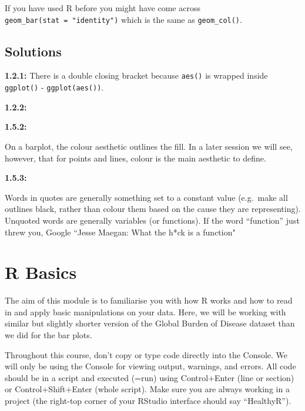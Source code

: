 \documentclass[]{book}
\makeatletter
\newenvironment{Shaded}{\begin{snugshade}}{\end{snugshade}}
\newcommand{\KeywordTok}[1]{\textcolor[rgb]{0.13,0.29,0.53}{\textbf{#1}}}
\newcommand{\DataTypeTok}[1]{\textcolor[rgb]{0.13,0.29,0.53}{#1}}
\newcommand{\StringTok}[1]{\textcolor[rgb]{0.31,0.60,0.02}{#1}}
\newcommand{\OperatorTok}[1]{\textcolor[rgb]{0.81,0.36,0.00}{\textbf{#1}}}
\newcommand{\NormalTok}[1]{#1}
\newenvironment{kframe}{%
\medskip{}
\setlength{\fboxsep}{.8em}
 \def\at@end@of@kframe{}%
 \ifinner\ifhmode%
  \def\at@end@of@kframe{\end{minipage}}%
  \begin{minipage}{\columnwidth}%
 \fi\fi%
 \def\FrameCommand##1{\hskip\@totalleftmargin \hskip-\fboxsep
 \colorbox{shadecolor}{##1}\hskip-\fboxsep
     \hskip-\linewidth \hskip-\@totalleftmargin \hskip\columnwidth}%
 \MakeFramed {\advance\hsize-\width
   \@totalleftmargin\z@ \linewidth\hsize
   \@setminipage}}%
 {\par\unskip\endMakeFramed%
 \at@end@of@kframe}
\renewenvironment{Shaded}{\begin{kframe}}{\end{kframe}}
\makeatother
\begin{document}
If you have used R before you might have come across
\texttt{geom\_bar(stat\ =\ "identity")} which is the same as
\texttt{geom\_col()}.

\section{Solutions}\label{solutions}

\textbf{1.2.1:} There is a double closing bracket because \texttt{aes()}
is wrapped inside \texttt{ggplot()} - \texttt{ggplot(aes())}.

\textbf{1.2.2:}

\begin{Shaded}
\end{Shaded}

\textbf{1.5.2:}

On a barplot, the colour aesthetic outlines the fill. In a later session
we will see, however, that for points and lines, colour is the main
aesthetic to define.

\textbf{1.5.3:}

Words in quotes are generally something set to a constant value
(e.g.~make all outlines black, rather than colour them based on the
cause they are representing). Unquoted words are generally variables (or
functions). If the word ``function'' just threw you, Google ``Jesse
Maegan: What the h*ck is a function"

\chapter{R Basics}\label{r-basics}

The aim of this module is to familiarise you with how R works and how to
read in and apply basic manipulations on your data. Here, we will be
working with similar but slightly shorter version of the Global Burden
of Disease dataset than we did for the bar plots.

Throughout this course, don't copy or type code directly into the
Console. We will only be using the Console for viewing output, warnings,
and errors. All code should be in a script and executed (=run) using
Control+Enter (line or section) or Control+Shift+Enter (whole script).
Make sure you are always working in a project (the right-top corner of
your RStudio interface should say ``HealthyR'').
\end{document}
